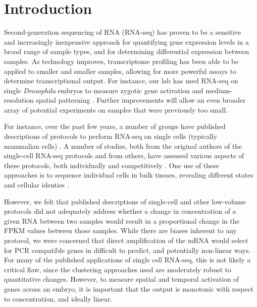 \section{Introduction}
Second-generation sequencing of RNA (RNA-seq) has proven to be a sensitive and increasingly inexpensive approach for quantifying gene expression levels in a broad range of sample types, and for determining differential expression between samples.  As technology improves, transcriptome profiling has been able to be applied to smaller and smaller samples, allowing for more powerful assays to determine transcriptional output.  For instance, our lab has used RNA-seq on single {\em Drosophila} embryos to measure zygotic gene activation \cite{Lott:2011cc} and medium-resolution spatial patterning \cite{Combs:2013jy}.  Further improvements will allow an even broader array of potential experiments on samples that were previously too small.

For instance, over the past few years, a number of groups have published descriptions of protocols to perform RNA-seq on single cells (typically mammalian cells) \cite{Tang:2009kj,Ramskold:2012gj,Sasagawa:2013jx,Hashimshony:2012ca,Islam:2011jr}. A number of studies, both from the original authors of the single-cell RNA-seq protocols and from others, have assessed various aspects of these protocols, both individually and competitively \cite{Bhargava:2014gf,Wu:2014eg,Marinov:2013fm}. One use of these approaches is to sequence individual cells in bulk tissues, revealing different states and cellular identies \cite{Buganim:2012hp,Treutlein:2014ec}.

However, we felt that published descriptions of single-cell and other low-volume protocols did not adequately address whether a change in concentration of a given RNA between two samples would result in a proportional change in the FPKM values between those samples. While there are biases inherent to any protocol, we were concerned that direct amplification of the mRNA would select for PCR compatible genes in difficult to predict, and potentially non-linear ways.  For many of the published applications of single cell RNA-seq, this is not likely a critical flaw, since the clustering approaches used are moderately robust to quantitative changes.  However, to measure spatial and temporal activation of genes across an embryo, it is important that the output is monotonic with respect to concentration, and ideally linear.



